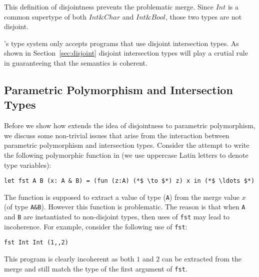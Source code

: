 \noindent This definition of disjointness prevents the problematic
merge. Since $Int$ is a common supertype of both $Int \& Char$ and
$Int \& Bool$, those two types are not disjoint.

\namedis's type system only accepts programs that use disjoint
intersection types. As shown in Section~\ref{sec:disjoint} disjoint intersection
types will play a crutial rule in guaranteeing that the semantics is coherent.

\subsection{Parametric Polymorphism and Intersection Types}\label{subsec:polymorphism}
Before we show how \namedis extends the idea of disjointness to parametric
polymorphism, we discuss some non-trivial issues that arise from
the interaction between parametric polymorphism and intersection types.
Consider the attempt to write
the following polymorphic function in \namedis (we use
uppercase Latin letters to denote type variables):
\begin{lstlisting}
let fst A B (x: A & B) = (fun (z:A) (*$ \to $*) z) x in (*$ \ldots $*)
\end{lstlisting}
The
 function is supposed to extract a value of type
(\lstinline{A}) from the merge value $x$ (of type \lstinline{A&B}). However
this function is problematic.  The reason is that when
\lstinline{A} and \lstinline{B} are instantiated to non-disjoint
types, then uses of \lstinline{fst} may lead to incoherence.
For example, consider the following use of \lstinline{fst}:
\begin{lstlisting}
fst Int Int (1,,2)
\end{lstlisting}
\noindent This program is clearly incoherent as both
$1$ and $2$ can be extracted from the merge and still match the type
of the first argument of \lstinline{fst}.

